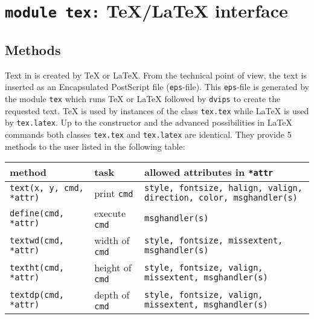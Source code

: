 \section{\texttt{module tex:} \TeX/\LaTeX{} interface}
\subsection{Methods}
\label{tex}
Text in \PyX{} is created by \TeX{} or \LaTeX. From the technical point
of view, the text is inserted as an Encapsulated PostScript file
(\verb|eps|-file). This \verb|eps|-file is generated by the module
\verb|tex| which runs \TeX{} or \LaTeX{} followed by \verb|dvips| to
create the requested text. \TeX{} is used by instances of the class
\verb|tex.tex| while \LaTeX{} is used by \verb|tex.latex|. Up to the
constructor and the advanced possibilities in \LaTeX{} commands both
classes \verb|tex.tex| and \verb|tex.latex| are identical. They
provide 5 methods to the user listed in the following table:

\bigskip
\begin{tabularx}{\linewidth}{ll>{\raggedright\arraybackslash}X}
method&task&allowed attributes in \texttt{*attr}\\
\hline
\texttt{text(x, y, cmd, *attr)}&print \texttt{cmd}&\texttt{style, fontsize, halign, valign, direction, color, msghandler(s)}\\
\texttt{define(cmd, *attr)}&execute \texttt{cmd}&\texttt{msghandler(s)}\\
\texttt{textwd(cmd, *attr)}&width of \texttt{cmd}&\texttt{style, fontsize, missextent, msghandler(s)}\\
\texttt{textht(cmd, *attr)}&height of \texttt{cmd}&\texttt{style, fontsize, valign, missextent, msghandler(s)}\\
\texttt{textdp(cmd, *attr)}&depth of \texttt{cmd}&\texttt{style, fontsize, valign, missextent, msghandler(s)}\\
\end{tabularx}
\bigskip

